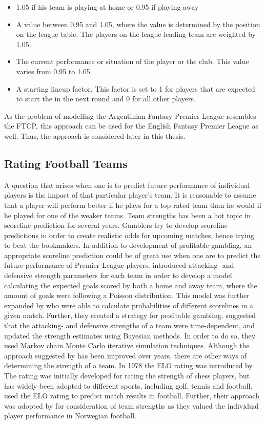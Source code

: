 \begin{itemize}
    \item 1.05 if his team is playing at home or 0.95 if playing away
    \item A value between 0.95 and 1.05, where the value is determined by the position on the league table. The players on the league leading team are weighted by 1.05.
    \item The current performance or situation of the player or the club. This value varies from 0.95 to 1.05.
    \item A starting lineup factor. This factor is set to 1 for players that are expected to start the in the next round and 0 for all other players. 
\end{itemize}
As the problem of modelling the Argentinian Fantasy Premier League resembles the FTCP, this approach can be used for the English Fantasy Premier League as well. Thus, the approach is considered later in this thesis. 


\subsection{Rating Football Teams} \label{Strength_of_football_teams} 
\newpar
A question that arises when one is to predict future performance of individual players is the impact of that particular player's team. It is reasonable to assume that a player will perform better if he plays for a top rated team than he would if he played for one of the weaker teams. Team strengths has been a hot topic in scoreline prediction for several years. Gamblers try to develop scoreline predictions in order to create realistic odds for upcoming matches, hence trying to beat the bookmakers. In addition to development of profitable gambling, an appropriate scoreline prediction could be of great use when one are to predict the future performance of Premier League players. 
\newpar
\cite{Maher} introduced attacking- and defensive strength parameters for each team in order to develop a model calculating the expected goals scored by both a home and away team, where the amount of goals were following a Poisson distribution. This model was further expanded by \cite{Dixon} who were able to calculate probabilities of different scorelines in a given match. Further, they created a strategy for profitable gambling. \cite{Rue} suggested that the attacking- and defensive strengths of a team were time-dependent, and updated the strength estimates using Bayesian methods. In order to do so, they used Markov chain Monte Carlo iterative simulation techniques. 
\newpar
Although the approach suggested by \cite{Maher} has been improved over years, there are other ways of determining the strength of a team. In 1978 the ELO rating was introduced by \cite{Elo}. The rating was initially developed for rating the strength of chess players, but has widely been adopted to different sports, including golf, tennis and football. \cite{Hvattum} used the ELO rating to predict match results in football. Further, their approach was adopted by \cite{vabo} for consideration of team strengths as they valued the individual player performance in Norwegian football. 

